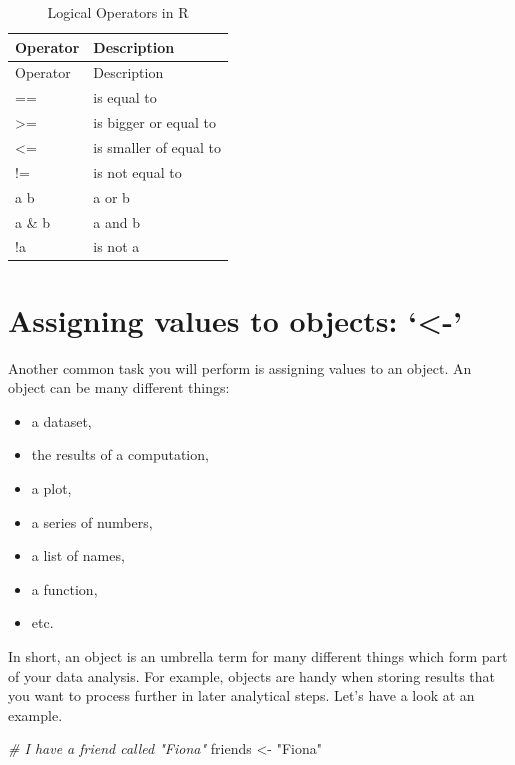 \documentclass[
]{book}
\newenvironment{Shaded}{\begin{snugshade}}{\end{snugshade}}
\newcommand{\CommentTok}[1]{\textcolor[rgb]{0.56,0.35,0.01}{\textit{#1}}}
\newcommand{\NormalTok}[1]{#1}
\newcommand{\OtherTok}[1]{\textcolor[rgb]{0.56,0.35,0.01}{#1}}
\newcommand{\StringTok}[1]{\textcolor[rgb]{0.31,0.60,0.02}{#1}}
\begin{document}
\begin{longtable}[]{@{}ll@{}}
\caption{\label{tab:logical-operators-r} Logical Operators in R}\tabularnewline
\toprule
Operator & Description \\
\midrule
\endfirsthead
\toprule
Operator & Description \\
\midrule
\endhead
== & is equal to \\
\textgreater= & is bigger or equal to \\
\textless= & is smaller of equal to \\
!= & is not equal to \\
a \textbar{} b & a or b \\
a \& b & a and b \\
!a & is not a \\
\bottomrule
\end{longtable}

\hypertarget{assigning-values-to-objects}{%
\section{Assigning values to objects: `\textless-'}\label{assigning-values-to-objects}}

Another common task you will perform is assigning values to an object. An object can be many different things:

\begin{itemize}
\item
  a dataset,
\item
  the results of a computation,
\item
  a plot,
\item
  a series of numbers,
\item
  a list of names,
\item
  a function,
\item
  etc.
\end{itemize}

In short, an object is an umbrella term for many different things which form part of your data analysis. For example, objects are handy when storing results that you want to process further in later analytical steps. Let's have a look at an example.

\begin{Shaded}
\begin{Highlighting}[]

\CommentTok{\# I have a friend called "Fiona"}
\NormalTok{friends }\OtherTok{\textless{}{-}} \StringTok{"Fiona"}
\end{Highlighting}
\end{Shaded}
\end{document}
